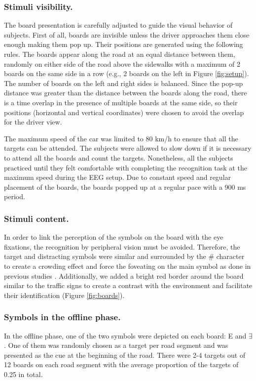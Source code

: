 \documentclass[12pt]{iopart}
\begin{document}
\subsubsection{Stimuli visibility.}
The board presentation is carefully adjusted to guide the visual behavior of subjects.
First of all, boards are invisible unless the driver approaches them
close enough making them pop up.
Their positions are generated using the following rules.
The boards appear along the road at an equal distance between them, 
randomly on either side of the road above the sidewalks
with a maximum of 2 boards
on the same side in a row  (e.g., 2 boards on the left in Figure \ref{fig:setup}). The number of boards on the left
and right sides is balanced. Since the pop-up distance was greater than the distance between the boards along the road, there is a time overlap in the presence of multiple boards at the same side, so their positions (horizontal and vertical coordinates) were chosen to avoid the overlap for the driver view.

The maximum speed of the car was limited to 80 km/h to ensure 
that all the targets
can be attended. The subjects were allowed to slow down if it is necessary
to attend all the boards and count the targets.
Nonetheless, all the subjects practiced until they felt comfortable 
with completing the recognition task at the maximum speed
during the EEG setup.
Due to constant speed and regular placement of the boards, the boards
popped up at a regular pace with a 900 ms period.

\subsubsection{Stimuli content.} In order to link the perception of the symbols on the board
with the eye fixations, the recognition by
peripheral vision must be avoided. Therefore, the target and distracting
symbols were similar and surrounded by the \# character to create
a crowding effect and force the foveating on the main symbol
as done in previous studies \cite{kamienkowski_fixation-related_2012}.
Additionally, we added a bright red border around the board similar 
to the traffic signs
to create a contrast with the environment and facilitate
their identification (Figure \ref{fig:boards}).

\subsubsection*{Symbols in the offline phase.}
In the offline phase, one of the two symbols were depicted on each board:
E and $\exists$.
One of them was randomly chosen as a target per road segment
and was presented as the cue
at the beginning of the road. There were 2-4 targets out of 12 boards
on each road segment with the average proportion of the targets of 0.25 in total.
\end{document}

